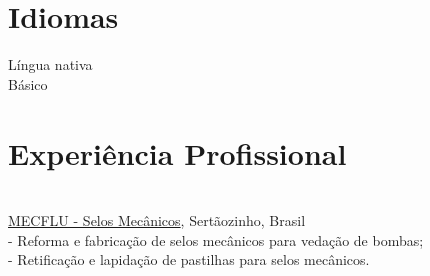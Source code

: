 \documentclass[mm]{simple_style}
\begin{document}
\begin{resume}
\vspace{-2ex}



\sectionline
\section{Idiomas}
\vspace{-1ex}
 Língua nativa\\
 Básico\par
\vspace{-1ex}
\sectionline



\section{Experiência Profissional}
\vspace{-1ex}
\\
\href{https://www.facebook.com/MecfluSelosMecanicos/}{MECFLU - Selos Mecânicos}, Sertãozinho, Brasil \\
- Reforma e fabricação de selos mecânicos para vedação de bombas;\\
- Retificação e lapidação de pastilhas para selos mecânicos.\par
\vspace{-1ex}
\sectionline






\end{resume}
\end{document}
